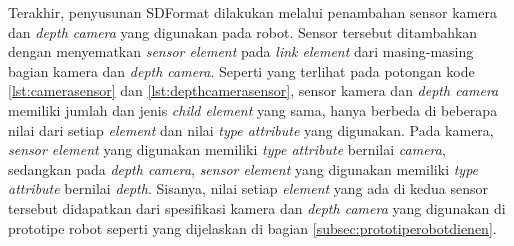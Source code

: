 





Terakhir, penyusunan SDFormat dilakukan melalui penambahan sensor kamera dan \emph{depth camera} yang digunakan pada robot.
Sensor tersebut ditambahkan dengan menyematkan \emph{sensor element} pada \emph{link element} dari masing-masing bagian kamera dan \emph{depth camera}.
Seperti yang terlihat pada potongan kode \ref{lst:camerasensor} dan \ref{lst:depthcamerasensor},
  sensor kamera dan \emph{depth camera} memiliki jumlah dan jenis \emph{child element} yang sama,
  hanya berbeda di beberapa nilai dari setiap \emph{element} dan nilai \emph{type attribute} yang digunakan.
  Pada kamera, \emph{sensor element} yang digunakan memiliki \emph{type attribute} bernilai \emph{camera},
  sedangkan pada \emph{depth camera}, \emph{sensor element} yang digunakan memiliki \emph{type attribute} bernilai \emph{depth}.
  Sisanya, nilai setiap \emph{element} yang ada di kedua sensor tersebut didapatkan dari spesifikasi kamera dan \emph{depth camera} yang digunakan di prototipe robot seperti yang dijelaskan di bagian \ref{subsec:prototiperobotdienen}.


